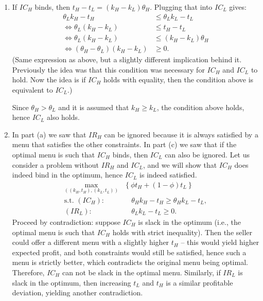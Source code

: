 \documentclass[a4paper]{article}
\begin{document}
\begin{enumerate}
\begin{enumerate}
		\item If $IC_H$ binds, then $t_H - t_L = (k_H - k_L) \theta_H$. Plugging that into $IC_L$ gives:
		\begin{align*}
			\theta_L k_H - t_H &\leq \theta_L k_L - t_L
			\\ \iff 
			\theta_L (k_H - k_L) &\leq t_H - t_L
			\\ \iff
			\theta_L (k_H - k_L) &\leq (k_H - k_L) \theta_H
			\\ \iff
			(\theta_H - \theta_L) (k_H -k_L) &\geq 0.
		\end{align*}
		(Same expression as above, but a slightly different implication behind it. Previously the idea was that this condition was necessary for $IC_H$ and $IC_L$ to hold. Now the idea is if $IC_H$ holds with equality, then the condition above is equivalent to $IC_L$.) 
		
		Since $\theta_H > \theta_L$ and it is assumed that $k_H \geq k_L$, the condition above holds, hence $IC_L$ also holds.
		
		\item In part (a) we saw that $IR_H$ can be ignored because it is always satisfied by a menu that satisfies the other constraints. In part (c) we saw that if the optimal menu is such that $IC_H$ binds, then $IC_L$ can also be ignored. Let us consider a problem without $IR_H$ and $IC_L$, and we will show that $IC_H$ does indeed bind in the optimum, hence $IC_L$ is indeed satisfied.
		\begin{align*}
			\max_{((k_H,t_H),(k_L,t_L))} & \left\{ \phi t_H + (1-\phi) t_L \right\}
			\\ \text{s.t. } (IC_H):&\quad \theta_H k_H - t_H \geq \theta_H k_L - t_L,
			\\ (IR_L):&\quad \theta_L k_L - t_L \geq 0.
		\end{align*}
		Proceed by contradiction: suppose $IC_H$ is slack in the optimum (i.e., the optimal menu is such that $IC_H$ holds with strict inequality). Then the seller could offer a different menu with a slightly higher $t_H$ -- this would yield higher expected profit, and both constraints would still be satisfied, hence such a menu is strictly better, which contradicts the original menu being optimal. Therefore, $IC_H$ can not be slack in the optimal menu. Similarly, if $IR_L$ is slack in the optimum, then increasing $t_L$ and $t_H$ is a similar profitable deviation, yielding another contradiction.
		

\end{enumerate}
\end{enumerate}
\end{document}
